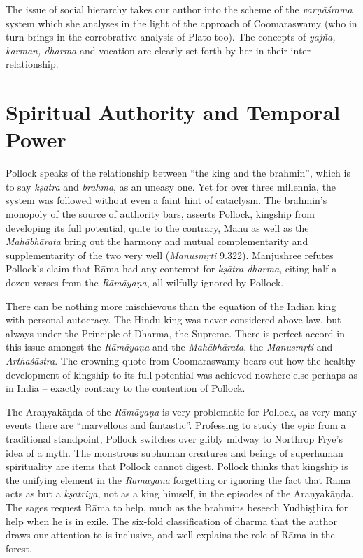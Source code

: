 The issue of social hierarchy takes our author into the scheme of the {\sl varṇāśrama} system which she analyses in the light of the approach of Coomaraswamy (who in turn brings in the corrobrative analysis of Plato too). The concepts of {\sl yajña, karman, dharma} and vocation are clearly set forth by her in their inter-relationship.\\[-20pt]

\section*{Spiritual Authority and Temporal Power}

Pollock speaks of the relationship between “the king and the brahmin”, which is to say {\sl kṣatra} and {\sl brahma}, as an uneasy one. Yet for over three millennia, the system was followed without even a faint hint of cataclysm. The brahmin's monopoly of the source of authority bars, asserts Pollock, kingship from developing its full potential; quite to the contrary, Manu as well as the {\sl Mahābhārata} bring out the harmony and mutual complementarity and supplementarity of the two very well ({\sl Manusmṛti} 9.322). Manjushree refutes Pollock's claim that Rāma had any contempt for {\sl kṣātra-dharma}, citing half a dozen verses from the {\sl Rāmāyaṇa}, all wilfully ignored by Pollock.

There can be nothing more mischievous than the equation of the Indian king with personal autocracy. The Hindu king was never considered above law, but always under the Principle of Dharma, the Supreme. There is perfect accord in this issue amongst the {\sl Rāmāyaṇa} and the {\sl Mahābhārata}, the {\sl Manusmṛti} and {\sl Arthaśāstra}. The crowning quote from Coomaraswamy bears out how the healthy development of kingship to its full potential was achieved nowhere else perhaps as in India -- exactly contrary to the contention of Pollock.

The Araṇyakāṇda of the {\sl Rāmāyaṇa} is very problematic for Pollock, as very many events there are “marvellous and fantastic”. Professing to study the epic from a traditional standpoint, Pollock switches over glibly midway to Northrop Frye's idea of a myth. The monstrous subhuman creatures and beings of superhuman spirituality are items that Pollock cannot digest. Pollock thinks that kingship is the unifying element in the {\sl Rāmāyaṇa} forgetting or ignoring the fact that Rāma acts as but a {\sl kṣatriya}, not as a king himself, in the episodes of the Araṇyakāṇḍa. The sages request Rāma to help, much as the brahmins beseech Yudhiṣṭhira for help when he is in exile. The six-fold classification of dharma that the author draws our attention to is inclusive, and well explains the role of Rāma in the forest.\\[-20pt]


